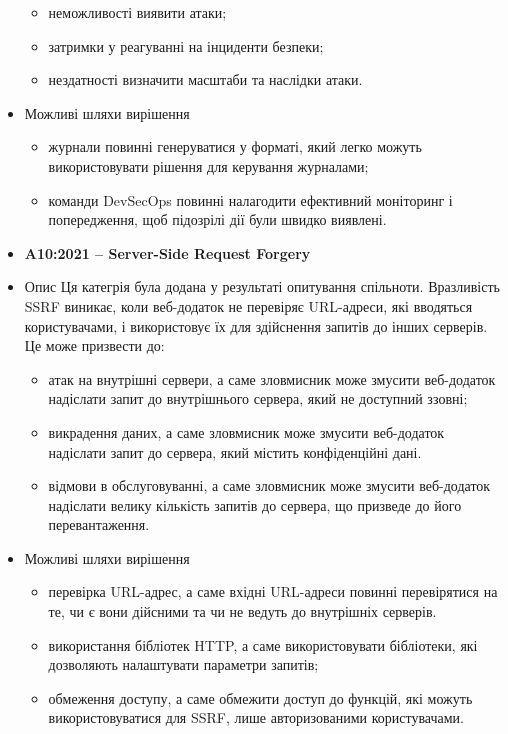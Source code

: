 \begin{itemize}
                \begin{itemize}
                    \item неможливості виявити атаки;
                    \item затримки у реагуванні на інциденти безпеки;
                    \item нездатності визначити масштаби та наслідки атаки.
                \end{itemize}
            \item Можливі шляхи вирішення
                \begin{itemize}
                    \item журнали повинні генеруватися у форматі, який легко можуть використовувати рішення для керування журналами;
                    \item команди DevSecOps повинні налагодити ефективний моніторинг і попередження, щоб підозрілі дії були швидко виявлені.
                \end{itemize}
    \item \textbf{A10:2021 – Server-Side Request Forgery}
            \item Опис
                Ця категрія була додана у результаті опитування спільноти. Вразливість SSRF виникає, коли веб-додаток не перевіряє URL-адреси, які вводяться користувачами, і використовує їх для здійснення запитів до інших серверів. Це може призвести до:
                \begin{itemize}
                    \item атак на внутрішні сервери, а саме зловмисник може змусити веб-додаток надіслати запит до внутрішнього сервера, який не доступний ззовні;
                    \item викрадення даних, а саме зловмисник може змусити веб-додаток надіслати запит до сервера, який містить конфіденційні дані.
                    \item відмови в обслуговуванні, а саме зловмисник може змусити веб-додаток надіслати велику кількість запитів до сервера, що призведе до його перевантаження.
                \end{itemize}

            \item Можливі шляхи вирішення
            \begin{itemize}
                \item перевірка URL-адрес, а саме вхідні URL-адреси повинні перевірятися на те, чи є вони дійсними та чи не ведуть до внутрішніх серверів.
                \item використання бібліотек HTTP, а саме використовувати бібліотеки, які дозволяють налаштувати параметри запитів;
                \item обмеження доступу, а саме обмежити доступ до функцій, які можуть використовуватися для SSRF, лише авторизованими користувачами.
            \end{itemize}
\end{itemize}

